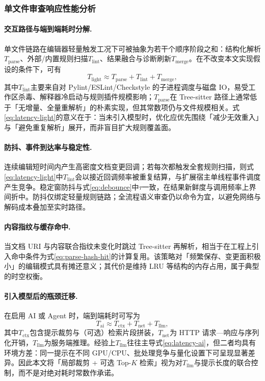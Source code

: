\subsubsection{单文件审查响应性能分析}

\paragraph{交互路径与端到端耗时分解.}
单文件链路在编辑器轻量触发工况下可被抽象为若干个顺序阶段之和：结构化解析\(T_{\mathrm{parse}}\)、外部/内置规则扫描\(T_{\mathrm{lint}}\)、结果融合与诊断刷新\(T_{\mathrm{merge}}\)。在不改变本文实现假设的条件下，可有
\begin{equation}
T_{\mathrm{light}}\approx T_{\mathrm{parse}}+T_{\mathrm{lint}}+T_{\mathrm{merge}},
\label{eq:latency-light}
\end{equation}
其中\(T_{\mathrm{lint}}\)主要来自对 Pylint/ESLint/Checkstyle 的子进程调度与磁盘 IO，易受工作区杀毒、解释器冷启动与规则插件规模影响；\(T_{\mathrm{parse}}\)在 Tree-sitter 路径上通常低于「无增量、全量重解析」的朴素实现，但其常数项仍与文件规模相关\cite{github2025treesitter,sadowski2018scaling}。式\eqref{eq:latency-light}的意义在于：当未引入模型时，优化应优先围绕「减少无效重入」与「避免重复解析」展开，而非盲目扩大规则覆盖面。

\paragraph{防抖、事件到达率与稳定性.}
连续编辑短时间内产生高密度文档变更回调；若每次都触发全套规则扫描，则式\eqref{eq:latency-light}中\(T_{\mathrm{lint}}\)会以接近回调频率被重复结算，与扩展宿主单线程事件调度产生竞争。稳定窗防抖与式\eqref{eq:debounce}中$\tau$一致，在结果新鲜度与调用频率上界间折中。防抖仅绑定轻量规则链路；全流程语义审查仍以命令为宜，以避免网络与解码成本叠加至实时路径。

\paragraph{内容指纹与缓存命中.}
当文档 URI 与内容联合指纹未变化时跳过 Tree-sitter 再解析，相当于在工程上引入命中条件为式\eqref{eq:parse-hash-hit}的计算复用。该策略对「频繁保存、变更面积极小」的编辑模式具有摊还意义；其代价是维持 LRU 等结构的内存占用，属于典型的时空权衡。

\paragraph{引入模型后的瓶颈迁移.}
在启用 AI 或 Agent 时，端到端耗时可写为
\begin{equation}
T_{\mathrm{ai}}\approx T_{\mathrm{ctx}}+T_{\mathrm{net}}+T_{\mathrm{llm}},
\label{eq:latency-ai}
\end{equation}
其中\(T_{\mathrm{ctx}}\)包含提示裁剪与（可选）检索片段拼装，\(T_{\mathrm{net}}\)为 HTTP 请求—响应与序列化开销，\(T_{\mathrm{llm}}\)为服务端推理。经验上\(T_{\mathrm{llm}}\)往往主导式\eqref{eq:latency-ai}，但二者均具有环境方差：同一提示在不同 GPU/CPU、批处理竞争与量化设置下可呈现显著差异\cite{hou2024llmse}。因此本文将「局部裁剪 + 可选 Top-\(K\) 检索」视为对\(T_{\mathrm{llm}}\)与提示长度的联合控制，而不是对绝对耗时常数作承诺。

